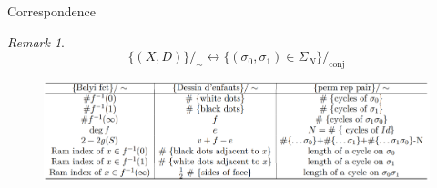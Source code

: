 \documentclass[pdf]{beamer}
\numberwithin{equation}{section}
\theoremstyle{plain}
\theoremstyle{plain}
\theoremstyle{remark}
\newtheorem{remark}[theorem]{Remark}
\begin{document}
%	
%	
%	
%								
\begin{frame}[fragile]{Correspondence}
	\begin{remark}
	$$\{(X,D)\}/_{\sim} \longleftrightarrow \{  (\sigma_0,\sigma_1) \in \Sigma_N \}/_{\text{conj}}$$
\end{remark}
\begin{figure}[th]
	\begin{minipage}[b]{\textwidth}
		\centering
		\includegraphics[width=1\textwidth]{figures/table.png}
	\end{minipage}
\end{figure}

\end{frame}
\end{document}
